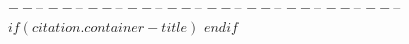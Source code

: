 $--%
$--%
$--%
$--%
$--%
$--%
$--%
$--%
$--%
$--%
$--%
$--%
$--%
$--%
$--%
$--%
$--%
$--%
$--%
$--%
$if(citation.container-title)$
$endif$